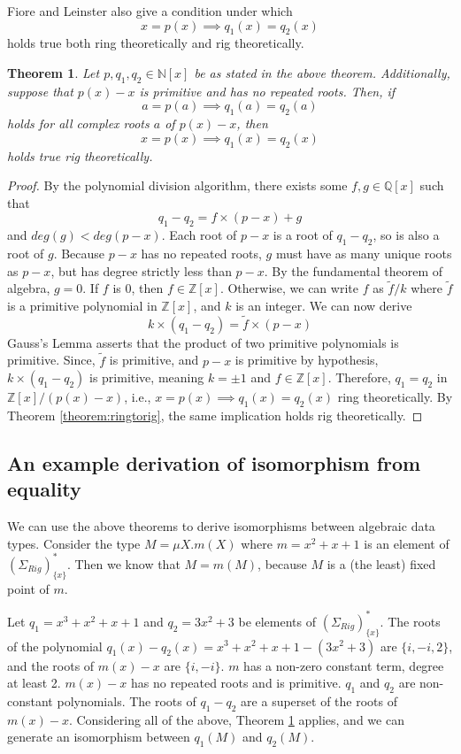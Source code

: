 \documentclass{msthesis}
\newtheorem{theorem}{Theorem}[section]
\theoremstyle{definition}
\newcommand{\ints}{\mathbb{Z}}
\newcommand{\nat}{\mathbb{N}}
\begin{document}
Fiore and Leinster also give a condition under which \[ x = p(x) \implies q_1(x) = q_2(x)\] holds true both ring theoretically and rig theoretically.

\begin{theorem}\label{theorem:complextoring}
    Let $p, q_1, q_2 \in \nat[x]$ be as stated in the above theorem.  Additionally, suppose that $p(x) - x$ is primitive and has no repeated roots.  Then, if 
    \[ a = p(a) \implies q_1(a) = q_2(a) \]
    holds for all complex roots $a$ of $p(x) - x$, then
    \[ x = p(x) \implies q_1(x) = q_2(x) \]
    holds true rig theoretically.
\end{theorem}
\begin{proof}
    By the polynomial division algorithm, 
    there exists some $f, g \in \mathbb{Q}[x]$ such that 
    \[ q_1 - q_2 = f \times (p - x) + g\]
    and $deg(g) < deg(p - x)$.  Each root of $p - x$ is a root of $q_1 - q_2$, so is also a root of $g$.  Because $p - x$ has no repeated roots, $g$ must have as many unique roots as $p - x$, but has degree strictly less than $p - x$.  By the fundamental theorem of algebra, $g = 0$.  If $f$ is $0$, then $f \in \ints[x]$.  Otherwise, we can write $f$ as $\tilde{f} / k$ where $\tilde{f}$ is a primitive polynomial in $\ints[x]$, and $k$ is an integer.  We can now derive
    \[ k\times (q_1 - q_2) = \tilde{f} \times (p - x)\]
    Gauss's Lemma asserts that the product of two primitive polynomials is primitive.  Since, $\tilde{f}$ is primitive, and $p - x$ is primitive by hypothesis, $k \times (q_1 - q_2)$ is primitive, meaning $k = \pm 1$ and $f \in \ints[x]$.
    Therefore, $q_1 = q_2$ in $\ints[x]/(p(x) - x)$, i.e., $x = p(x) \implies q_1(x) = q_2(x)$ ring theoretically. By Theorem \ref{theorem:ringtorig}, the same implication holds rig theoretically.
\end{proof}

\subsection{An example derivation of isomorphism from equality}
We can use the above theorems to derive isomorphisms between algebraic data types. Consider the type $M = \mu X. m(X)$ where $m = x^2 + x + 1$ is an element of $(\Sigma_{Rig})^*_{\{x\}}$.  Then we know that $M = m(M)$, because $M$ is a (the least) fixed point of $m$.  

Let $q_1 = x^3 + x^2 + x + 1$ and $q_2  = 3x^2 + 3$ be elements of $(\Sigma_{Rig})^*_{\{x\}}$.  The roots of the polynomial $q_1(x) - q_2(x) = x^3 + x^2 + x + 1 - (3x^2 + 3)$ are $\{i, -i, 2\}$, and the roots of $m(x) - x$ are $\{i, -i\}$.  $m$ has a non-zero constant term, degree at least 2.  $m(x) - x$ has no repeated roots and is primitive.  $q_1$ and $q_2$ are non-constant polynomials.  The roots of $q_1 - q_2$ are a superset of the roots of $m(x) - x$.  Considering all of the above, Theorem \ref{theorem:complextoring} applies, and we can generate an isomorphism between $q_1(M)$ and $q_2(M)$.
\end{document}
